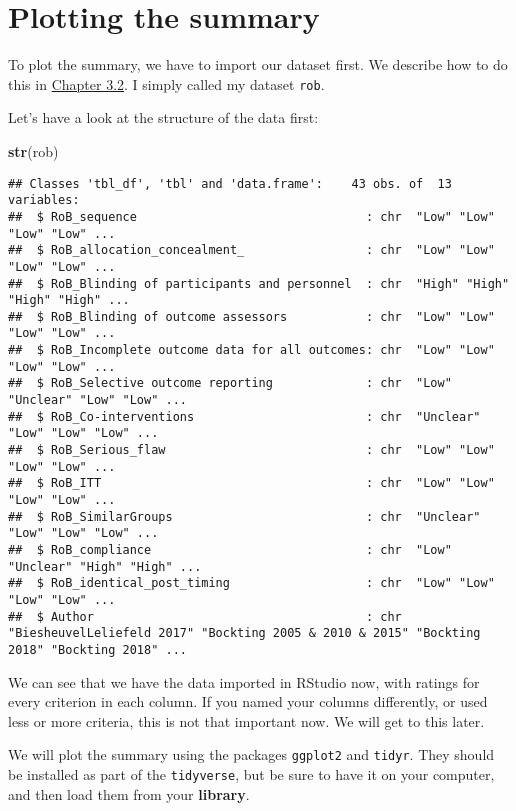 \documentclass[]{book}
\newenvironment{Shaded}{\begin{snugshade}}{\end{snugshade}}
\newcommand{\KeywordTok}[1]{\textcolor[rgb]{0.13,0.29,0.53}{\textbf{#1}}}
\newcommand{\NormalTok}[1]{#1}
\theoremstyle{definition}
\theoremstyle{definition}
\theoremstyle{definition}
\theoremstyle{remark}
\begin{document}
\section{Plotting the summary}\label{plotting-the-summary}

To plot the summary, we have to import our dataset first. We describe
how to do this in \protect\hyperlink{import_excel}{Chapter 3.2}. I
simply called my dataset \texttt{rob}.

Let's have a look at the structure of the data first:

\begin{Shaded}
\begin{Highlighting}[]
\KeywordTok{str}\NormalTok{(rob)}
\end{Highlighting}
\end{Shaded}

\begin{verbatim}
## Classes 'tbl_df', 'tbl' and 'data.frame':    43 obs. of  13 variables:
##  $ RoB_sequence                                : chr  "Low" "Low" "Low" "Low" ...
##  $ RoB_allocation_concealment_                 : chr  "Low" "Low" "Low" "Low" ...
##  $ RoB_Blinding of participants and personnel  : chr  "High" "High" "High" "High" ...
##  $ RoB_Blinding of outcome assessors           : chr  "Low" "Low" "Low" "Low" ...
##  $ RoB_Incomplete outcome data for all outcomes: chr  "Low" "Low" "Low" "Low" ...
##  $ RoB_Selective outcome reporting             : chr  "Low" "Unclear" "Low" "Low" ...
##  $ RoB_Co-interventions                        : chr  "Unclear" "Low" "Low" "Low" ...
##  $ RoB_Serious_flaw                            : chr  "Low" "Low" "Low" "Low" ...
##  $ RoB_ITT                                     : chr  "Low" "Low" "Low" "Low" ...
##  $ RoB_SimilarGroups                           : chr  "Unclear" "Low" "Low" "Low" ...
##  $ RoB_compliance                              : chr  "Low" "Unclear" "High" "High" ...
##  $ RoB_identical_post_timing                   : chr  "Low" "Low" "Low" "Low" ...
##  $ Author                                      : chr  "BiesheuvelLeliefeld 2017" "Bockting 2005 & 2010 & 2015" "Bockting 2018" "Bockting 2018" ...
\end{verbatim}

We can see that we have the data imported in RStudio now, with ratings
for every criterion in each column. If you named your columns
differently, or used less or more criteria, this is not that important
now. We will get to this later.

We will plot the summary using the packages \texttt{ggplot2} and
\texttt{tidyr}. They should be installed as part of the
\texttt{tidyverse}, but be sure to have it on your computer, and then
load them from your \textbf{library}.
\end{document}
